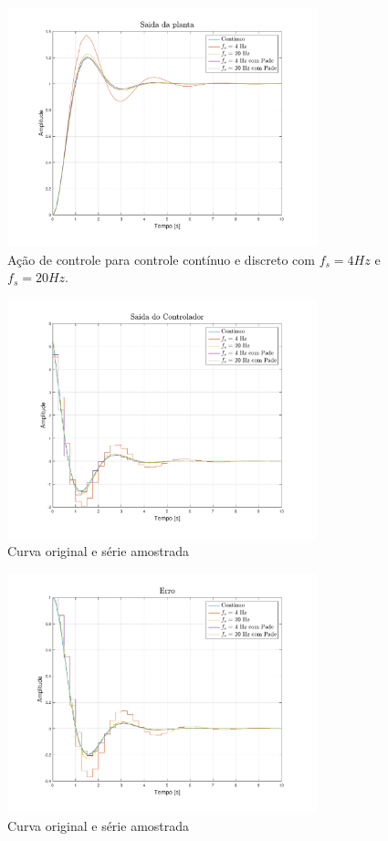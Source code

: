     \begin{figure}[htp]
	\center
	\includegraphics[width=0.8\textwidth]{images/saidazoh.pdf}
	\caption{Ação de controle para controle contínuo e discreto com $f_s = 4 Hz$ e $f_s = 20 Hz$. }
	\label{fig:ex6controle}
    \end{figure}
    
\newpage

    \begin{figure}[H]
	\center
	\includegraphics[width=0.8\textwidth]{images/controlezoh.pdf}
	\caption{Curva original e série amostrada}
	\label{fig:ex6saida}
    \end{figure}

    \begin{figure}[H]
	\center
	\includegraphics[width=0.8\textwidth]{images/errozoh.pdf}
	\caption{Curva original e série amostrada}
	\label{fig:ex6erro}
    \end{figure}
    
